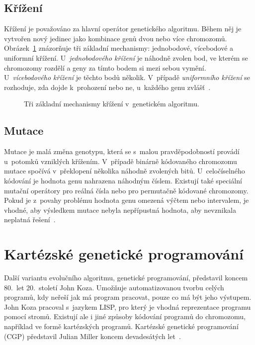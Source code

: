 \subsection{Křížení}

Křížení je považováno za hlavní operátor genetického algoritmu. Během něj je vytvořen nový jedinec jako kombinace genů dvou nebo více chromozomů. Obrázek~\ref{obrKrizeni} znázorňuje tři základní mechanismy: jednobodové, vícebodové a uniformní křížení. U~\emph{jednobodového křížení} je náhodně zvolen bod, ve kterém se chromozomy rozdělí a geny za tímto bodem si mezi sebou vymění. U~\emph{vícebodového křížení} je těchto bodů několik. V~případě \emph{uniformního křížení} se rozhoduje, zda dojde k~prohození nebo ne, u~každého genu zvlášť~\cite{Modra}.

\begin{figure}[htb]
    \centering
    \hskip1.5cm
    \hskip1.5cm
    \caption{Tři základní mechanismy křížení v~genetickém algoritmu.}
    \label{obrKrizeni}
\end{figure}


\subsection{Mutace}

Mutace je malá změna genotypu, která se s~malou pravděpodobností provádí u~potomků vzniklých křížením. V~případě binárně kódovaného chromozomu mutace spočívá v~překlopení několika náhodně zvolených bitů. U~celočíselného kódování je hodnota genu nahrazena náhodným číslem. Existují také speciální mutační operátory pro reálná čísla nebo pro permutačně kódované chromozomy. Pokud je z~povahy problému hodnota genu omezená výčtem nebo intervalem, je vhodné, aby výsledkem mutace nebyla nepřípustná hodnota, aby nevznikala neplatná řešení~\cite{Modra}.

\section{Kartézské genetické programování}
\label{secCGP}

Další variantu evolučního algoritmu, genetické programování, představil koncem 80.~let 20.~století John Koza. Umožňuje automatizovanou tvorbu celých programů, kdy neřeší jak má program pracovat, pouze co má být jeho výstupem. John Koza pracoval s~jazykem LISP, pro který je vhodná reprezentace programu pomocí stromů. Existují ale i jiné způsoby kódování programů do chromozomu, například ve formě kartézských programů. Kartézské genetické programování (CGP) představil Julian Miller koncem devadesátých let~\cite{Miller2000}.

